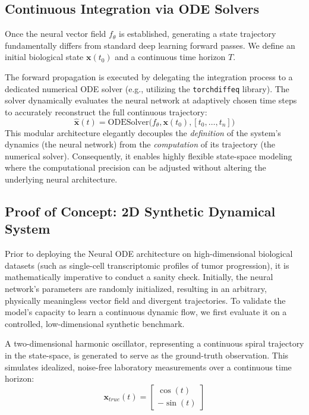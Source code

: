 \documentclass[12pt, a4paper]{article}
\begin{document}
	\subsection{Continuous Integration via ODE Solvers}
	Once the neural vector field $f_{\theta}$ is established, generating a state trajectory fundamentally differs from standard deep learning forward passes. We define an initial biological state $\mathbf{x}(t_0)$ and a continuous time horizon $T$. 
	
	The forward propagation is executed by delegating the integration process to a dedicated numerical ODE solver (e.g., utilizing the \texttt{torchdiffeq} library). The solver dynamically evaluates the neural network at adaptively chosen time steps to accurately reconstruct the full continuous trajectory:
	$$ \mathbf{\hat{x}}(t) = \text{ODESolver}\Big(f_{\theta}, \mathbf{x}(t_0), [t_0, \dots, t_n]\Big) $$
	This modular architecture elegantly decouples the \textit{definition} of the system's dynamics (the neural network) from the \textit{computation} of its trajectory (the numerical solver). Consequently, it enables highly flexible state-space modeling where the computational precision can be adjusted without altering the underlying neural architecture.
	
	\subsection{Proof of Concept: 2D Synthetic Dynamical System}
	
	Prior to deploying the Neural ODE architecture on high-dimensional biological datasets (such as single-cell transcriptomic profiles of tumor progression), it is mathematically imperative to conduct a sanity check. Initially, the neural network's parameters are randomly initialized, resulting in an arbitrary, physically meaningless vector field and divergent trajectories. To validate the model's capacity to learn a continuous dynamic flow, we first evaluate it on a controlled, low-dimensional synthetic benchmark.
	
	A two-dimensional harmonic oscillator, representing a continuous spiral trajectory in the state-space, is generated to serve as the ground-truth observation. This simulates idealized, noise-free laboratory measurements over a continuous time horizon:
	$$ \mathbf{x}_{true}(t) = \begin{bmatrix} \cos(t) \\ -\sin(t) \end{bmatrix} $$
	
\end{document}
